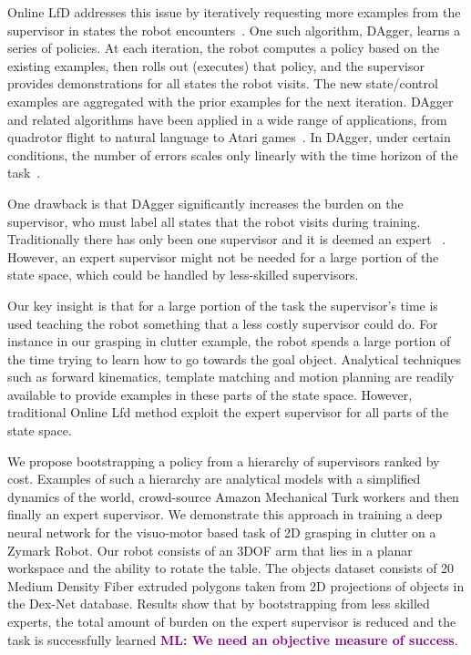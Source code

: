 \documentclass[10pt, conference]{ieeeconf}      %
\newcommand{\mlnote}[1]{\ifthenelse{ \boolean{include-notes}}%
 {\textcolor{purple}{\textbf{ML: #1}}}{}}
\begin{document}
Online LfD addresses this issue by iteratively requesting more examples from the supervisor in states the robot encounters~\cite{grollman2007dogged,ross2010efficient,ross2010reduction}. One such algorithm, DAgger, learns a series of policies. At each iteration, the robot computes a policy based on the existing examples, then rolls out (executes) that policy, and the supervisor provides demonstrations for all states the robot visits. The new state/control examples are aggregated with the prior examples for the next iteration. DAgger and related algorithms have been applied in a wide range of applications, from quadrotor flight to natural language to Atari games~\cite{NIPS2014_5421,duvallet2013imitation,ross2013learning}. In DAgger, under certain conditions, the number of errors scales only linearly with the time horizon of the task~\cite{ross2010reduction}.


One drawback is that DAgger significantly increases the burden on the supervisor, who must label all states that the robot visits during training.  Traditionally there has only been one supervisor and it is deemed an expert ~\cite{ross2010efficient,ross2010reduction,ross2013learning,duvallet2013imitation}. However, an expert supervisor might not be needed for a large portion of the state space, which could be handled by less-skilled supervisors.

Our key insight is that for a large portion of the task the supervisor's time is used teaching the robot something that a less costly supervisor could do. For instance in our grasping in clutter example, the robot spends a large portion of the time trying to learn how to go towards the goal object. Analytical techniques such as forward kinematics, template matching and motion planning are readily available to provide examples in these parts of the state space. However, traditional Online Lfd method exploit the expert supervisor for all parts of the state space. 

We propose bootstrapping a policy from a hierarchy of supervisors ranked by cost. Examples of such a hierarchy are analytical models with a simplified dynamics of the world, crowd-source Amazon Mechanical Turk workers and then finally an expert supervisor. We demonstrate this approach in training a deep neural network for the visuo-motor based task of 2D grasping in clutter on a Zymark Robot. Our robot consists of an 3DOF arm that lies in a planar workspace and the ability to rotate the table. The objects dataset consists of 20 Medium Density Fiber extruded polygons taken from 2D projections of objects in the Dex-Net \cite{} database.  Results show that by bootstrapping from less skilled experts, the total amount of burden on the expert supervisor is reduced and the task is successfully learned \mlnote{We need an objective measure of success}. 
\end{document}
